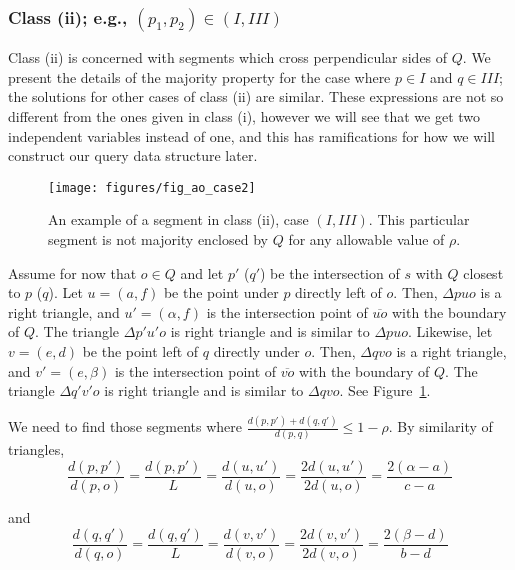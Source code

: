 \subsubsection*{Class (ii); e.g., $(p_1, p_2) \in (I, III)$}
\label{:rectanges:ao:class2}

Class (ii) is concerned with segments which cross perpendicular sides of $Q$. We present the details of the majority property for the case where $p \in I$ and $q \in III$; the solutions for other cases of class (ii) are similar. These expressions are not so different from the ones given in class (i), however we will see that we get two independent variables instead of one, and this has ramifications for how we will construct our query data structure later.

\begin{figure}[t]
\begin{center}
  \texttt{[image: figures/fig\_ao\_case2]}
  \caption[An example of a segment in class (ii), case $(I, III)$.]{An example of a segment in class (ii), case $(I, III)$. This particular segment is not majority enclosed by $Q$ for any allowable value of $\rho$.}
  \label{fig:rectangles:ao:case2}
\end{center}
\end{figure}

Assume for now that $o \in Q$ and let $p'$ ($q'$) be the intersection of $s$ with $Q$ closest to $p$ ($q$).  Let $u = (a, f)$ be the point under $p$ directly left of $o$. Then, $\Delta p u o$ is a right triangle, and $u' = (\alpha, f)$ is the intersection point of $\overline{u o}$ with the boundary of $Q$.  The triangle $\Delta p' u' o$ is right triangle and is similar to $\Delta p u o$. Likewise, let $v = (e, d)$ be the point left of $q$ directly under $o$. Then, $\Delta q v o$ is a right triangle, and $v' = (e, \beta)$ is the intersection point of $\overline{v o}$ with the boundary of $Q$. The triangle $\Delta q' v' o$ is right triangle and is similar to $\Delta q v o$. See Figure~\ref{fig:rectangles:ao:case2}.

We need to find those segments where $\frac{d(p, p') + d(q, q')}{d(p, q)} \leq 1 - \rho$. By similarity of triangles, 
\[ 
\frac{d(p, p')}{d(p, o)} = \frac{d(p, p')}{L} = \frac{d(u, u')}{d(u, o)} =  \frac{2 d(u, u')}{2 d(u, o)} = \frac{2(\alpha - a)}{c - a}
\]

\noindent and 
\[ 
\frac{d(q, q')}{d(q, o)} = \frac{d(q, q')}{L} = \frac{d(v, v')}{d(v, o)} = \frac{2 d(v, v')}{2 d(v, o)} = \frac{2(\beta - d)}{b - d}
\]

